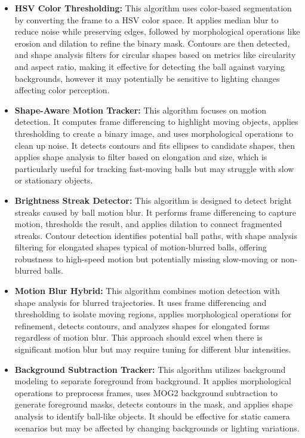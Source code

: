 \documentclass[12pt,a4paper]{article}
\begin{document}
\begin{itemize}
    \item \textbf{HSV Color Thresholding:} This algorithm uses color-based segmentation by converting the frame to a HSV color space. It applies median blur to reduce noise while preserving edges, followed by morphological operations like erosion and dilation to refine the binary mask. Contours are then detected, and shape analysis filters for circular shapes based on metrics like circularity and aspect ratio, making it effective for detecting the ball against varying backgrounds, however it may potentially be sensitive to lighting changes affecting color perception.
    
    \item \textbf{Shape-Aware Motion Tracker:} This algorithm focuses on motion detection. It computes frame differencing to highlight moving objects, applies thresholding to create a binary image, and uses morphological operations to clean up noise. It detects contours and fits ellipses to candidate shapes, then applies shape analysis to filter based on elongation and size, which is particularly useful for tracking fast-moving balls but may struggle with slow or stationary objects.
    
    \item \textbf{Brightness Streak Detector:} This algorithm is designed to detect bright streaks caused by ball motion blur. It performs frame differencing to capture motion, thresholds the result, and applies dilation to connect fragmented streaks. Contour detection identifies potential ball paths, with shape analysis filtering for elongated shapes typical of motion-blurred balls, offering robustness to high-speed motion but potentially missing slow-moving or non-blurred balls.

    \item \textbf{Motion Blur Hybrid:} This algorithm combines motion detection with shape analysis for blurred trajectories. It uses frame differencing and thresholding to isolate moving regions, applies morphological operations for refinement, detects contours, and analyzes shapes for elongated forms regardless of motion blur. This approach should excel when there is significant motion blur but may require tuning for different blur intensities.

    \item \textbf{Background Subtraction Tracker:} This algorithm utilizes background modeling to separate foreground from background. It applies morphological operations to preprocess frames, uses MOG2 background subtraction to generate foreground masks, detects contours in the mask, and applies shape analysis to identify ball-like objects. It should be effective for static camera scenarios but may be affected by changing backgrounds or lighting variations.
    

\end{itemize}
\end{document}
